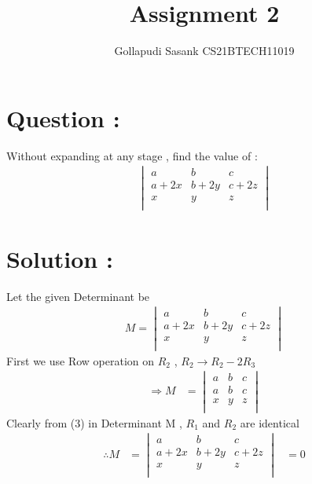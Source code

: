 \documentclass[twocolumn]{article}
\title{Assignment 2}
\author{Gollapudi Sasank CS21BTECH11019}
\newcommand{\mydet}[1]{\ensuremath{\begin{vmatrix}#1\end{vmatrix}}}
\begin{document}
\maketitle
\section*{Question : }
Without expanding at any stage , find the value of : 
\begin{align}
\mydet{a & b & c \\ a+2x & b+2y & c+2z \\ x & y & z \\}
\end{align}
\section*{Solution :}
Let the given Determinant be
\begin{align}
M = \mydet{a & b & c \\ a+2x & b+2y & c+2z \\ x & y & z \\}
\end{align}
First we use Row operation on $R_2$ , $ R_2 \rightarrow R_2 - 2R_3 $
\begin{align}
\Rightarrow M &=  \mydet{a & b & c \\ a & b & c \\ x & y & z \\} 
\end{align}
Clearly from (3) in Determinant M , $R_1$ and $R_2$ are identical  
\begin{align} 
\therefore M &= \mydet{a & b & c\\ a+2x & b+2y & c+2z \\ x & y & z \\} &= 0  
\end{align}
\end{document}

